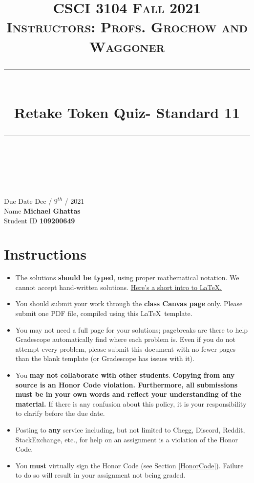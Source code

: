 \documentclass[11pt]{article}
\title{
\normalfont \normalsize 
\textsc{CSCI 3104 Fall 2021 \\ 
Instructors: Profs. Grochow and Waggoner} \\
[10pt] 
\rule{\linewidth}{0.5pt} \\[6pt] 
\huge Retake Token Quiz- Standard 11 \\
\rule{\linewidth}{2pt}  \\[10pt]
}
\date{}
\theoremstyle{definition}
\theoremstyle{definition}
\theoremstyle{definition}
\begin{document}

\maketitle


\noindent
Due Date \dotfill Dec / $9^{th}$ / 2021 \\
Name \dotfill \textbf{Michael Ghattas} \\
Student ID \dotfill \textbf{109200649} \\


\tableofcontents

\section{Instructions}
 \begin{itemize}
	\item The solutions \textbf{should be typed}, using proper mathematical notation. We cannot accept hand-written solutions. \href{http://ece.uprm.edu/~caceros/latex/introduction.pdf}{Here's a short intro to \LaTeX.}
	\item You should submit your work through the \textbf{class Canvas page} only. Please submit one PDF file, compiled using this \LaTeX \ template.
	\item You may not need a full page for your solutions; pagebreaks are there to help Gradescope automatically find where each problem is. Even if you do not attempt every problem, please submit this document with no fewer pages than the blank template (or Gradescope has issues with it).

	\item You \textbf{may not collaborate with other students}. \textbf{Copying from any source is an Honor Code violation. Furthermore, all submissions must be in your own words and reflect your understanding of the material.} If there is any confusion about this policy, it is your responsibility to clarify before the due date. 

	\item Posting to \textbf{any} service including, but not limited to Chegg, Discord, Reddit, StackExchange, etc., for help on an assignment is a violation of the Honor Code.

	\item You \textbf{must} virtually sign the Honor Code (see Section \ref{HonorCode}). Failure to do so will result in your assignment not being graded.
\end{itemize}
\end{document}
